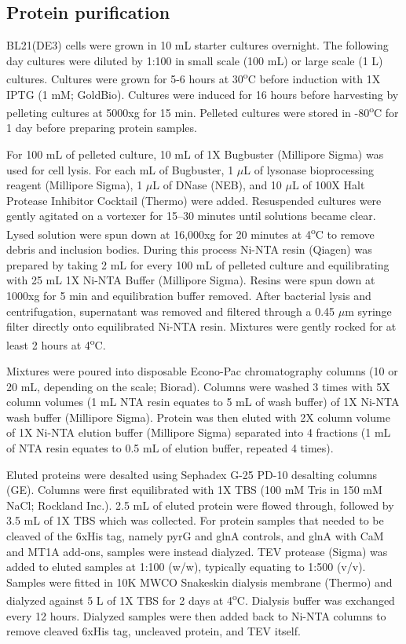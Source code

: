 \documentclass[../main/main]{subfiles}
\begin{document}
\subsection*{Protein purification}
BL21(DE3) cells were grown in 10 mL starter cultures overnight. The following day cultures were diluted by 1:100 in small scale (100 mL) or large scale (1 L) cultures. Cultures were grown for 5-6 hours at 30\textsuperscript{o}C before induction with 1X IPTG (1 mM; GoldBio). Cultures were induced for 16 hours before harvesting by pelleting cultures at 5000xg for 15 min. Pelleted cultures were stored in -80\textsuperscript{o}C for 1 day before preparing protein samples.

For 100 mL of pelleted culture, 10 mL of 1X Bugbuster (Millipore Sigma) was used for cell lysis. For each mL of Bugbuster, 1 $\mu$L of lysonase bioprocessing reagent (Millipore Sigma), 1 $\mu$L of DNase (NEB), and 10 $\mu$L of 100X Halt Protease Inhibitor Cocktail (Thermo) were added. Resuspended cultures were gently agitated on a vortexer for 15--30 minutes until solutions became clear. Lysed solution were spun down at 16,000xg for 20 minutes at 4\textsuperscript{o}C to remove debris and inclusion bodies. During this process Ni-NTA resin (Qiagen) was prepared by taking 2 mL for every 100 mL of pelleted culture and equilibrating with 25 mL 1X Ni-NTA Buffer (Millipore Sigma). Resins were spun down at 1000xg for 5 min and equilibration buffer removed. After bacterial lysis and centrifugation, supernatant was removed and filtered through a 0.45 $\mu$m syringe filter directly onto equilibrated Ni-NTA resin. Mixtures were gently rocked for at least 2 hours at 4\textsuperscript{o}C.

Mixtures were poured into disposable Econo-Pac chromatography columns (10 or 20 mL, depending on the scale; Biorad). Columns were washed 3 times with 5X column volumes (1 mL NTA resin equates to 5 mL of wash buffer) of 1X Ni-NTA wash buffer (Millipore Sigma). Protein was then eluted with 2X column volume of 1X Ni-NTA elution buffer (Millipore Sigma) separated into 4 fractions (1 mL of NTA resin equates to 0.5 mL of elution buffer, repeated 4 times).

Eluted proteins were desalted using Sephadex G-25 PD-10 desalting columns (GE). Columns were first equilibrated with 1X TBS (100 mM Tris in 150 mM NaCl; Rockland Inc.). 2.5 mL of eluted protein were flowed through, followed by 3.5 mL of 1X TBS which was collected. For protein samples that needed to be cleaved of the 6xHis tag, namely pyrG and glnA controls, and glnA with CaM and MT1A add-ons, samples were instead dialyzed. TEV protease (Sigma) was added to eluted samples at 1:100 (w/w), typically equating to 1:500 (v/v). Samples were fitted in 10K MWCO Snakeskin dialysis membrane (Thermo) and dialyzed against 5 L of 1X TBS for 2 days at 4\textsuperscript{o}C. Dialysis buffer was exchanged every 12 hours. Dialyzed samples were then added back to Ni-NTA columns to remove cleaved 6xHis tag, uncleaved protein, and TEV itself.
\end{document}
